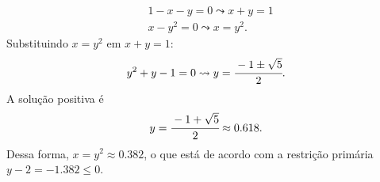 \documentclass[11pt,a4paper]{article}
\begin{document}
\begin{enumerate}
\begin{itemize}
\begin{enumerate}[label=\roman*]
                \begin{equation*}
                    \begin{aligned}
                        & 1 - x - y = 0 \leadsto x + y = 1\\
                        & x - y^2 = 0 \leadsto x = y^2.
                    \end{aligned}
                \end{equation*}
                Substituindo $x = y^2$ em $x + y = 1$:
                \begin{equation*}
                    y^2 + y - 1 = 0 \leadsto y = \cfrac{-1 \pm \sqrt{5}}{2}.
                \end{equation*}
                A solução positiva é 
                \begin{equation*}
                    y = \cfrac{-1 + \sqrt{5}}{2} \approx 0.618.
                \end{equation*}
                Dessa forma, $x = y^2 \approx 0.382$, o que está de acordo com a restrição primária $y -2 = -1.382 \leq 0$.


\end{enumerate}
\end{itemize}
\end{enumerate}
\end{document}
